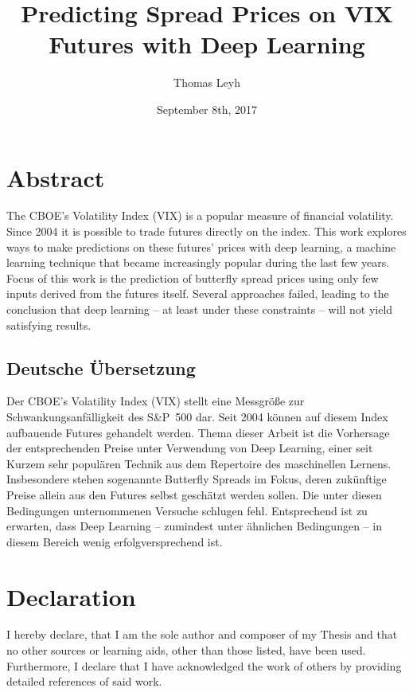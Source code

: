\documentclass[abstract=true,caption=above]{scrreprt}
\title{Predicting Spread Prices on VIX Futures with Deep Learning}
\author{Thomas Leyh}
\date{September 8th, 2017}
\begin{document}
	
\maketitle


\chapter*{Abstract}

The CBOE's Volatility Index (VIX) is a popular measure of financial volatility. Since 2004 it is possible to trade futures directly on the index. This work explores ways to make predictions on these futures' prices with deep learning, a machine learning technique that became increasingly popular during the last few years. Focus of this work is the prediction of butterfly spread prices using only few inputs derived from the futures itself. Several approaches failed, leading to the conclusion that deep learning -- at least under these constraints -- will not yield satisfying results.

\vspace{1in}

\section*{Deutsche Übersetzung}

Der CBOE's Volatility Index (VIX) stellt eine Messgröße zur Schwankungsanfälligkeit des S\&P~500 dar. Seit 2004 können auf diesem Index aufbauende Futures gehandelt werden. Thema dieser Arbeit ist die Vorhersage der entsprechenden Preise unter Verwendung von Deep Learning, einer seit Kurzem sehr populären Technik aus dem Repertoire des maschinellen Lernens. Insbesondere stehen sogenannte Butterfly Spreads im Fokus, deren zukünftige Preise allein aus den Futures selbst geschätzt werden sollen. Die unter diesen Bedingungen unternommenen Versuche schlugen fehl. Entsprechend ist zu erwarten, dass Deep Learning -- zumindest unter ähnlichen Bedingungen -- in diesem Bereich wenig erfolgversprechend ist.

\chapter*{Declaration}

I hereby declare, that I am the sole author and composer of my Thesis and that no other sources or learning aids, other than those listed, have been used. Furthermore, I declare that I have acknowledged the work of others by providing detailed references of said work.
\end{document}
